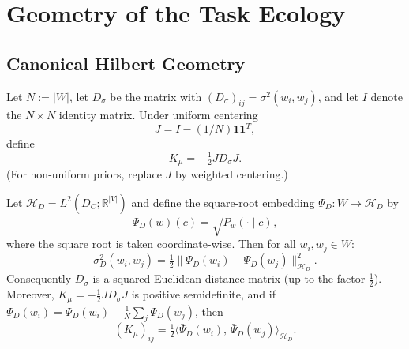 \documentclass[twoside,11pt]{article}
\newcommand{\sigmasq}{\sigma^2}
\newcommand{\R}{\mathbb{R}}
\begin{document}


\appendix
\section{Geometry of the Task Ecology}\label{app:geometry}

\subsection{Canonical Hilbert Geometry}

\begin{definition}
Let $N := |W|$, let $D_\sigma$ be the matrix with $(D_\sigma)_{ij} = \sigmasq(w_i, w_j)$, and let $I$ denote the $N \times N$ identity matrix. Under uniform centering
\[
J = I - (1/N)\mathbf{1}\mathbf{1}^T,
\]
define
\[
K_\mu = -\tfrac{1}{2} J D_\sigma J.
\]
(For non-uniform priors, replace $J$ by weighted centering.)
\end{definition}

\begin{proposition}\label{prop:hilbert-kernel}
Let $\mathcal{H}_D = L^2(D_C;\allowbreak \R^{|V|})$ and define the square-root embedding $\Psi_D \colon W \to \mathcal{H}_D$ by
\[
\Psi_D(w)(c) = \sqrt{P_w(\cdot \mid c)},
\]
where the square root is taken coordinate-wise. Then for all $w_i,w_j \in W$:
\[
\sigmasq_D(w_i,w_j) = \tfrac{1}{2}\|\Psi_D(w_i) - \Psi_D(w_j)\|^2_{\mathcal{H}_D}.
\]
Consequently $D_\sigma$ is a squared Euclidean distance matrix (up to the factor $\tfrac{1}{2}$). Moreover, $K_\mu = -\tfrac{1}{2} J D_\sigma J$ is positive semidefinite, and if $\bar{\Psi}_D(w_i) = \Psi_D(w_i) - \tfrac{1}{N}\sum_j \Psi_D(w_j)$, then
\[
(K_\mu)_{ij} = \tfrac{1}{2}\langle \bar{\Psi}_D(w_i),\, \bar{\Psi}_D(w_j)\rangle_{\mathcal{H}_D}.
\]
\end{proposition}
\end{document}
